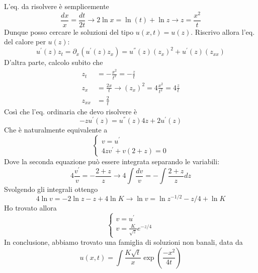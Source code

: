 \documentclass{report}
\begin{document}
\begin{example}
\begin{enumerate}
    L'eq. da risolvere è semplicemente 
    \begin{equation}
        \frac{dx}{x} = \frac{dt}{2t} \rightarrow 2\ln{x} = \ln{(t)} + \ln{z} \rightarrow z = \frac{x^2}{t}
    \end{equation}
    Dunque posso cercare le soluzioni del tipo $u(x, t) = u(z)$. Riscrivo allora l'eq. del calore per $u(z)$: 
    \begin{equation}
        u^{'}(z)z_t = \partial_x(u^{'}(z)z_x) = u^{''}(z)(z_x)^2 + u^{'}(z)(z_{xx})
    \end{equation}
    D'altra parte, calcolo subito che 
    \begin{align}
        z_t &= -\frac{x^2}{t^2}= -\frac{z}{t}\\
        z_x &= \frac{2x}{t} \rightarrow (z_x)^2 = 4\frac{x^2}{t^2} = 4\frac{z}{t} \\
        z_{xx} &= \frac{2}{t}
    \end{align}
    Così che l'eq. ordinaria che devo risolvere è 
    \begin{equation}
        -zu^{'}(z) = u^{''}(z)4z + 2u^{'}(z)
    \end{equation}
    Che è naturalmente equivalente a 
    \[\begin{cases}
        v = u^{'} \\
        4zv^{'} + v(2+z) = 0  
    \end{cases}\]
    Dove la seconda equazione può essere integrata separando le variabili: 
    \begin{equation}
        4\frac{v^{'}}{v} = -\frac{2+z}{z} \rightarrow 4\int\frac{dv}{v} = -\int\frac{2+z}{z}dz
    \end{equation}
    Svolgendo gli integrali ottengo
    \begin{equation}
        4\ln{v} = -2\ln{z} -z + 4\ln{K} \rightarrow \ln{v} = \ln{z^{-1/2}} -z/4 +\ln{K}
    \end{equation}
    Ho trovato allora 
    \[\begin{cases}
        v = u^{'} \\ v = \frac{K}{\sqrt{z}}e^{-z/4}
    \end{cases}\]
    In conclusione, abbiamo trovato una famiglia di soluzioni non banali, data da
    \begin{equation}
        u(x, t) = \int \frac{K\sqrt{t}}{x}\exp{\left(\frac{-x^2}{4t} \right)}
    \end{equation}
\end{enumerate}
\end{example}
\end{document}
